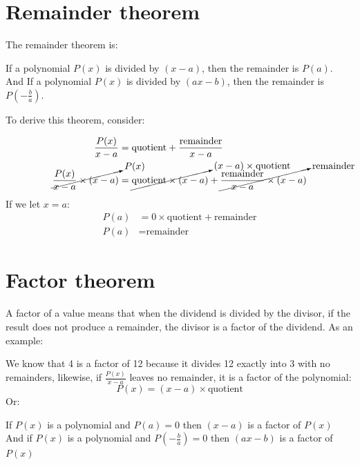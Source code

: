 \documentclass{book}
\begin{document}
\section{Remainder theorem}
The remainder theorem is:
\begin{center}
	If a polynomial $P(x)$ is divided by $(x - a)$, then the remainder is $P(a)$.\\
	And If a polynomial $P(x)$ is divided by $(ax - b)$, then the remainder is $P(-\frac{b}{a})$.
\end{center}

To derive this theorem, consider:
\begin{center}
	\begin{align*}
		\frac{P(x)}{x - a}                                 & = \text{quotient} + \frac{\text{remainder}}{x - a}                                                                                                       \\
		\cancelto{P(x)}{\frac{P(x)}{x - a} \times (x - a)} & = \cancelto{(x - a) \times \text{quotient}}{\text{quotient} \times (x - a)} + \cancelto{\text{remainder}}{\frac{\text{remainder}}{x - a} \times (x - a)}
	\end{align*}
	If we let $x = a$:
	\begin{align*}
		P(a) & = 0 \times \text{quotient} + \text{remainder} \\
		P(a) & = \text{remainder}
	\end{align*}
\end{center}

\section{Factor theorem}
A factor of a value means that when the dividend is divided by the divisor, if the result does not produce a remainder, the divisor is a factor of the dividend.  As an example:

We know that 4 is a factor of 12 because it divides 12 exactly into 3 with no remainders, likewise, if $\frac{P(x)}{x - a}$ leaves no remainder, it is a factor of the polynomial:
\[
	P(x) = (x - a) \times \text{quotient}
\]
Or:
\begin{center}
	If $P(x)$ is a polynomial and $P(a) = 0$ then $(x - a)$ is a factor of $P(x)$\\
	And if $P(x)$ is a polynomial and $P(-\frac{b}{a}) = 0$ then $(ax - b)$ is a factor of $P(x)$
\end{center}
\end{document}
